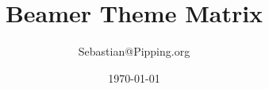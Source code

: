 \documentclass{beamer}
\title[Short Title]{Beamer Theme Matrix}
\author{Sebastian@Pipping.org}
\institute{Institute}
\date{\today}
\begin{document}
	\frame{\titlepage}
	
\end{document}
